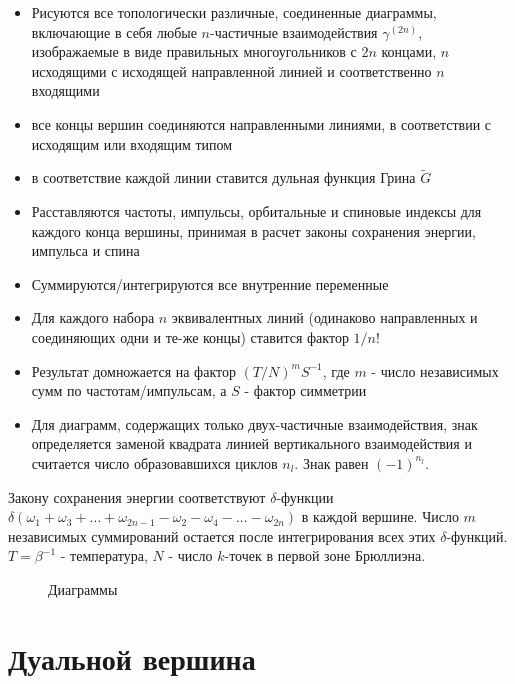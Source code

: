 \documentclass[11pt,a4paper]{report}
\begin{document}
\begin{itemize}
 \label{rules}
 \item Рисуются все топологически различные, соединенные диаграммы, включающие в себя любые $n$-частичные взаимодействия $\gamma^{(2n)}$, изображаемые в виде правильных многоугольников с $2n$ концами, 
 $n$ исходящими с исходящей направленной линией и соответственно $n$ входящими
 \item все концы вершин соединяются направленными линиями, в соответствии с исходящим или входящим типом
 \item в соответствие каждой линии ставится дульная функция Грина $\tilde{G}$
 \item Расставляются частоты, импульсы, орбитальные и спиновые индексы для каждого конца вершины, принимая в расчет законы сохранения энергии, импульса и спина
 \item Суммируются/интегрируются все внутренние переменные
 \item Для каждого набора $n$ эквивалентных линий (одинаково направленных и соединяющих одни и те-же концы) ставится фактор $1/n!$
 \item Результат домножается на фактор $(T/N)^m S^{-1}$, где $m$ - число независимых сумм по частотам/импульсам, а $S$ - фактор симметрии\cite{negele1998quantum}
 \item Для диаграмм, содержащих только двух-частичные взаимодействия, знак определяется заменой квадрата линией вертикального взаимодействия и считается число образовавшихся циклов $n_l$. Знак равен $(-1)^{n_l}$.
\end{itemize}
 
Закону сохранения энергии соответствуют $\delta$-функции $\delta(\omega_1+\omega_3+\dots+\omega_{2n-1}-\omega_2-\omega_4-\dots-\omega_{2n})$ в каждой вершине.
Число $m$ независимых суммирований остается после интегрирования всех этих $\delta$-функций. $T = \beta^{-1}$ - температура, $N$ - число $k$-точек в первой зоне Брюллиэна.
 
\begin{figure}[H]
\label{diags}
\centering
\subfigure[\label{fig:diag0}]{\diagzero}
\subfigure[]{\diagtwoG}
\subfigure[]{\diagthreeGempty}
\subfigure[]{\begin{tikzpicture}[baseline=-35pt]{\node{\diagsixempty};}\end{tikzpicture}}
\caption{Диаграммы}
\end{figure}

\section{Дуальной вершина}
\end{document}
